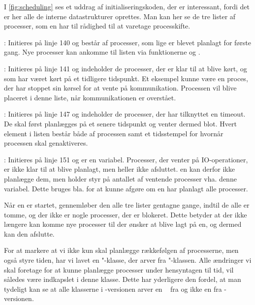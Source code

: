  I \cref{fig:scheduling} ses et uddrag af initialiseringskoden, der er interessant, fordi det er her alle de interne datastrukturer oprettes. Man kan her se de tre lister af processer, som \sched en har til rådighed til at varetage processkifte. 
 \begin{list}
 \tightlist 
 \item {}: Initieres på linje 140 og består af processer, som lige er blevet planlagt for første gang. Nye processer kan ankomme til listen  via funktionerne  og .
 \item {}: Initieres på linje 141 og indeholder de processer, der er klar til at blive kørt, og som har været kørt på et tidligere tidspunkt. Et eksempel kunne være en proces, der har stoppet sin kørsel for at vente på kommunikation. Processen vil blive placeret i denne liste, når kommunikationen er overstået. 
 \item {}: Initieres på linje 147 og indeholder de processer, der har tilknyttet en timeout. De skal først planlægges på et senere tidspunkt og venter dermed blot. Hvert element i listen består både af processen samt et tidsstempel for hvornår processen skal genaktiveres. 
 \item {}: Initieres på linje 151 og er en variabel. Processer, der venter på IO-operationer, er ikke klar til at blive planlagt, men heller ikke afsluttet. \Sched en kan derfor ikke planlægge dem, men holder styr på antallet af ventende processer vha. denne variabel. Dette bruges bla. for at kunne afgøre om \sched en har planlagt alle processer.
\end{list}

Når \sched en er startet, gennemløber den alle tre lister gentagne gange, indtil de alle er tomme, og der ikke er nogle processer, der er blokeret. Dette betyder at der ikke længere kan komme nye processer til der ønsker at blive lagt på \sched en, og dermed kan den afslutte.

For at markere at vi ikke kun skal  planlægge rækkefølgen
af processerne, men også styre tiden, har vi lavet en
"-klasse, der arver fra "-klassen. Alle ændringer
vi skal foretage for at kunne planlægge processer under hensyntagen til tid, vil således være indkapslet i denne klasse. 
Dette har yderligere den fordel, at man tydeligt kan se at alle klasserne i -versionen arver en \sched~ fra  og
ikke en \sched \xspace fra -versionen.

